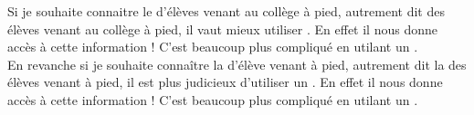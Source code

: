 \begin{exempleboxsuite}
    Si je souhaite connaitre le  d'élèves venant au collège à pied,
    autrement dit  des élèves venant au collège à pied, il
    vaut mieux utiliser . En effet il nous
    donne  accès à cette information ! C'est beaucoup plus compliqué
    en utilant un . \\

    En revanche si je souhaite connaître la  d'élève venant à
    pied, autrement dit la  des élèves venant à pied, il est plus
    judicieux d'utiliser un . En effet il nous
    donne  accès à cette information ! C'est beaucoup plus compliqué
    en utilant un . \\
\end{exempleboxsuite}
